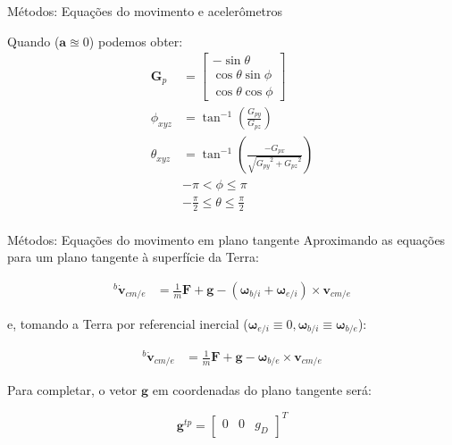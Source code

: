 \documentclass{beamer}
\begin{document}
\begin{frame}{Métodos: Equações do movimento e acelerômetros}

Quando (\(\mathbf{a}\approxeq0\)) podemos obter:
\begin{align*}
    {\mathbf{G}}_p &=
    \begin{bmatrix} 
    -\sin{\theta}\\
    \cos{\theta}\sin{\phi}\\
    \cos{\theta}\cos{\phi}
    \end{bmatrix} \\
{\phi}_{xyz} &= \tan^{-1}\left(\frac{G_{py}}{G_{pz}}\right) \\
{\theta}_{xyz} &= \tan^{-1}\left(\frac{-G_{px}}{\sqrt{{{G_{py}}^{2}}+{{{G}_{pz}}^2}}}\right) \\
    &-\pi  < \phi \leq \pi \\
    &-\frac{\pi}{2} \leq \theta \leq \frac{\pi}{2} \\
\end{align*}
\end{frame}

\begin{frame}{Métodos: Equações do movimento em plano tangente}
    Aproximando as equações para um plano tangente à superfície da Terra:

\begin{align*}
    {^{b}{\dot{\mathbf{v}}_{cm/e}}} &= \textstyle{\frac{1}{m}} \mathbf{F} + \mathbf{g} - {\left( \mathbf{\omega}_{b/i} + \mathbf{\omega}_{e/i} \right)} \times \mathbf{v}_{cm/e}
\end{align*}

e, tomando a Terra por referencial inercial (\(\mathbf{\omega}_{e/i} \equiv 0 , \mathbf{\omega}_{b/i} \equiv \mathbf{\omega}_{b/e}\)):

\begin{align}\label{eq:1.7-16c}
   {^{b}{\dot{\mathbf{v}}_{cm/e}}} &= \textstyle{\frac{1}{m}} \mathbf{F} + \mathbf{g} - \mathbf{\omega}_{b/e} \times \mathbf{v}_{cm/e}
\end{align}

Para completar, o vetor \(\mathbf{g}\) em coordenadas do plano tangente será:

\begin{equation}
\mathbf{g}^{tp} = {\begin{bmatrix} 0 & 0& g_{D} \end{bmatrix}}^{T}
\end{equation}

\end{frame}
\end{document}
